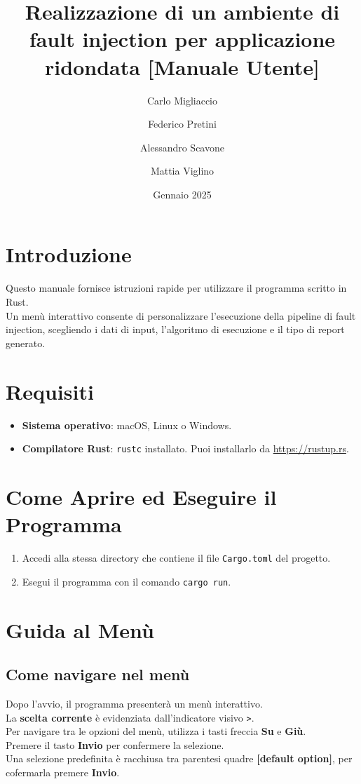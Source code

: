 \documentclass{article}
\title{\textbf{Realizzazione di un ambiente di fault injection per applicazione ridondata [Manuale Utente]}}
\author{Carlo Migliaccio}
\author{Federico Pretini}
\author{Alessandro Scavone}
\author{Mattia Viglino}
\affil[1]{\small{Laurea Magistrale in Ingegneria Informatica, Politecnico di Torino}}
\date{Gennaio 2025}
\begin{document}
\renewcommand{\labelenumii}{\arabic{enumi}.\arabic{enumii}}

\maketitle
\thispagestyle{empty}
\vspace{-0.8cm}
\tableofcontents

\section*{Introduzione}
Questo manuale fornisce istruzioni rapide per utilizzare il programma scritto in Rust. \\
Un menù interattivo consente di personalizzare l'esecuzione della pipeline di fault injection, scegliendo i dati di input, l'algoritmo di esecuzione e il tipo di report generato.

\section*{Requisiti}
\begin{itemize}
\item \textbf{Sistema operativo}: macOS, Linux o Windows.
\item \textbf{Compilatore Rust}: \texttt{rustc} installato. Puoi installarlo da \url{https://rustup.rs}.
\end{itemize}

\section*{Come Aprire ed Eseguire il Programma}
\begin{enumerate}
\item Accedi alla stessa directory che contiene il file \texttt{Cargo.toml} del progetto.
\item Esegui il programma con il comando \texttt{cargo run}.
\end{enumerate}

\section*{Guida al Menù}
\subsection{Come navigare nel menù}
Dopo l'avvio, il programma presenterà un menù interattivo.\\
La \textbf{scelta corrente} è evidenziata dall'indicatore visivo \texttt{>}.\\
Per navigare tra le opzioni del menù, utilizza i tasti freccia \textbf{Su} e \textbf{Giù}.\\
Premere il tasto \textbf{Invio} per confermere la selezione. \\ 
Una selezione predefinita è racchiusa tra parentesi quadre \textbf{[default option]}, per cofermarla premere \textbf{Invio}.
\end{document}
